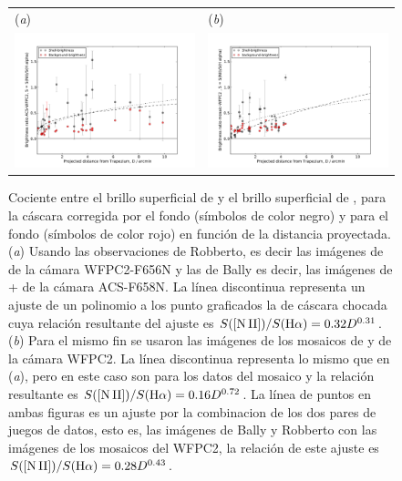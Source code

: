 \begin{figure}[htp]
\centering
\begin{tabular}{l l}
(\textit{a}) & (\textit{b})  \\
  \includegraphics[width=0.48\linewidth, trim=20 9.5 50 20, clip]{./acs_wfpc2-ratio-Nii_ha-vs-D_-mean-error_new}
& \includegraphics[width=0.48\linewidth, trim=20 9.5 50 20, clip]{./wfpc2-mosaic-ratio-Nii_ha-vs-D_-mean-error_new}\\
\end{tabular}
\caption{Cociente entre el brillo superficial de \nii{} y el brillo superficial de \ha{}, para la cáscara corregida por el fondo (símbolos de color negro) y para el fondo (símbolos de color rojo) en función de la distancia proyectada. (\textit{a}) Usando las observaciones de Robberto, es decir las imágenes de \ha{} de la cámara WFPC2-F656N y las de Bally es decir, las imágenes de \ha{}+\nii{} de la cámara ACS-F658N. La línea discontinua representa un ajuste de un polinomio a los punto graficados la de cáscara chocada cuya relación resultante del ajuste es \(S(\mathrm{[N\,II]}{})/S(\mathrm{H}\alpha{})=0.32D^{0.31}\). (\textit{b}) Para el mismo fin se usaron las imágenes de los mosaicos de \ha{} y \nii{} de la cámara WFPC2. La línea discontinua representa lo mismo que en (\textit{a}), pero en este caso son para los datos del mosaico y la relación resultante es \(S(\mathrm{[N\,II]}{})/S(\mathrm{H}\alpha{})=0.16D^{0.72}\). La línea de puntos en ambas figuras es un  ajuste  por la combinacion de los dos pares de juegos de datos, esto es, las imágenes de Bally y Robberto con las imágenes de los mosaicos del WFPC2, la relación de este ajuste es \(S(\mathrm{[N\,II]}{})/S(\mathrm{H}\alpha{})=0.28D^{0.43}\).}\label{fig:ratio-nii-ha}
\end{figure}

